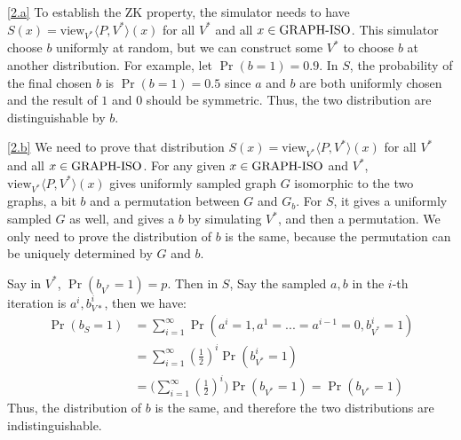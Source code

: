 \documentclass{homework}
\begin{document}
\begin{solution}
\ref{2.a} To establish the ZK property, the simulator needs to have $S(x) = \text{view}_{V^*}\langle P,V^*\rangle(x)$ for all $V^*$ and all $x\in\mathrm{GRAPH\text{-}ISO}$. This simulator choose $b$ uniformly at random, but we can construct some $V^*$ to choose $b$ at another distribution. For example, let $\Pr(b=1)=0.9$. In $S$, the probability of the final chosen $b$ is $\Pr(b=1) = 0.5$ since $a$ and $b$ are both uniformly chosen and the result of $1$ and $0$ should be symmetric. Thus, the two distribution are distinguishable by $b$.

\ref{2.b} We need to prove that distribution $S(x) = \text{view}_{V^*}\langle P,V^*\rangle(x)$ for all $V^*$ and all $x\in\mathrm{GRAPH\text{-}ISO}$. For any given $x\in\mathrm{GRAPH\text{-}ISO}$ and $V^*$, $\text{view}_{V^*}\langle P,V^*\rangle(x)$ gives uniformly sampled graph $G$ isomorphic to the two graphs, a bit $b$ and a permutation between $G$ and $G_b$. For $S$, it gives a uniformly sampled $G$ as well, and gives a $b$ by simulating $V^*$, and then a permutation. We only need to prove the distribution of $b$ is the same, because the permutation can be uniquely determined by $G$ and $b$.

Say in $V^*$, $\Pr(b_{V^*}=1)=p$. Then in $S$, Say the sampled $a,b$ in the $i$-th iteration is $a^i,b^i_{V*}$, then we have:
\begin{align*}
  \Pr(b_S=1) &= \sum_{i=1}^\infty \Pr(a^i = 1, a^1 = ... = a^{i-1} = 0, b^i_{V^*}=1)\\
  &=  \sum_{i=1}^\infty (\frac{1}{2})^i\Pr(b^i_{V^*}=1)\\
  &= \bigl(\sum_{i=1}^\infty (\frac{1}{2})^i\bigr)\Pr(b_{V^*}=1) = \Pr(b_{V^*}=1)
\end{align*}
Thus, the distribution of $b$ is the same, and therefore the two distributions are indistinguishable.
\end{solution}
\end{document}
